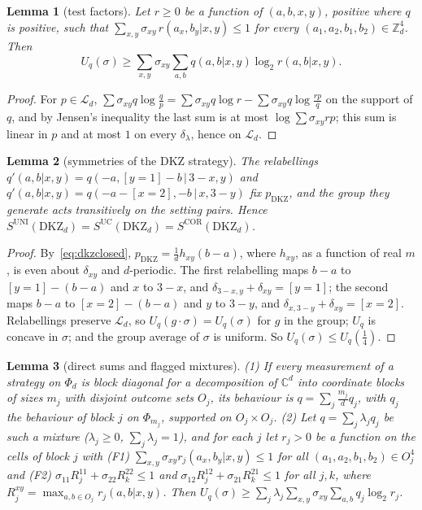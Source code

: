 \documentclass[11pt]{article}
\newtheorem{lemma}{Lemma}[section]
\theoremstyle{remark}
\numberwithin{equation}{section}
\newcommand{\Z}{\mathbb{Z}}
\newcommand{\C}{\mathbb{C}}
\newcommand{\cL}{\mathcal{L}}
\newcommand{\DKZ}{\mathrm{DKZ}}
\newcommand{\UNI}{\mathrm{UNI}}
\newcommand{\UC}{\mathrm{UC}}
\newcommand{\COR}{\mathrm{COR}}
\begin{document}
\begin{lemma}[test factors]\label{lem:testfactor}
Let $r\ge0$ be a function of $(a,b,x,y)$, positive where $q$ is positive, such that
$\sum_{x,y}\sigma_{xy}\,r(a_x,b_y|x,y)\le1$ for every $(a_1,a_2,b_1,b_2)\in\Z_d^4$. Then
\[
U_q(\sigma)\ge\sum_{x,y}\sigma_{xy}\sum_{a,b}q(a,b|x,y)\log_2r(a,b|x,y).
\]
\end{lemma}

\begin{proof}
For $p\in\cL_d$, $\sum\sigma_{xy}q\log\frac qp=\sum\sigma_{xy}q\log r-\sum\sigma_{xy}q\log\frac{rp}q$ on the support of
$q$, and by Jensen's inequality the last sum is at most $\log\sum\sigma_{xy}rp$; this sum is linear in $p$ and at most
$1$ on every $\delta_\lambda$, hence on $\cL_d$.
\end{proof}

\begin{lemma}[symmetries of the DKZ strategy]\label{lem:symmetry}
The relabellings $q'(a,b|x,y)=q(-a,[y=1]-b\,|\,3-x,y)$ and $q'(a,b|x,y)=q(-a-[x=2],-b\,|\,x,3-y)$ fix $p_{\DKZ}$, and the
group they generate acts transitively on the setting pairs. Hence $S^{\UNI}(\DKZ_d)=S^{\UC}(\DKZ_d)=S^{\COR}(\DKZ_d)$.
\end{lemma}

\begin{proof}
By~\eqref{eq:dkzclosed}, $p_{\DKZ}=\frac1dh_{xy}(b-a)$, where $h_{xy}$, as a function of real $m$, is even about
$\delta_{xy}$ and $d$-periodic. The first relabelling maps $b-a$ to $[y=1]-(b-a)$ and $x$ to $3-x$, and
$\delta_{3-x,y}+\delta_{xy}=[y=1]$; the second maps $b-a$ to $[x=2]-(b-a)$ and $y$ to $3-y$, and
$\delta_{x,3-y}+\delta_{xy}=[x=2]$. Relabellings preserve $\cL_d$, so $U_q(g\cdot\sigma)=U_q(\sigma)$ for $g$ in the
group; $U_q$ is concave in $\sigma$; and the group average of $\sigma$ is uniform. So $U_q(\sigma)\le U_q(\frac14)$.
\end{proof}

\begin{lemma}[direct sums and flagged mixtures]\label{lem:flagged}
\textup{(1)} If every measurement of a strategy on $\Phi_d$ is block diagonal for a decomposition of $\C^d$ into
coordinate blocks of sizes $m_j$ with disjoint outcome sets $O_j$, its behaviour is $q=\sum_j\frac{m_j}dq_j$, with $q_j$
the behaviour of block $j$ on $\Phi_{m_j}$, supported on $O_j\times O_j$.
\textup{(2)} Let $q=\sum_j\lambda_jq_j$ be such a mixture ($\lambda_j\ge0$, $\sum_j\lambda_j=1$), and for each $j$ let
$r_j>0$ be a function on the cells of block $j$ with \textup{(F1)} $\sum_{x,y}\sigma_{xy}r_j(a_x,b_y|x,y)\le1$ for all
$(a_1,a_2,b_1,b_2)\in O_j^4$ and \textup{(F2)} $\sigma_{11}R_j^{11}+\sigma_{22}R_k^{22}\le1$ and
$\sigma_{12}R_j^{12}+\sigma_{21}R_k^{21}\le1$ for all $j,k$, where $R_j^{xy}=\max_{a,b\in O_j}r_j(a,b|x,y)$. Then
$U_q(\sigma)\ge\sum_j\lambda_j\sum_{x,y}\sigma_{xy}\sum_{a,b}q_j\log_2r_j$.
\end{lemma}
\end{document}
